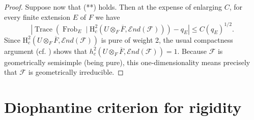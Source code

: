 \begin{proof}
Suppose now that (**) holds. Then at the expense of enlarging \(C\), for every finite extension \(E\) of \(F\) we have
\[
\left|\operatorname{Trace}(\operatorname{Frob}_E\mid\mathrm{H}^2_c(U\otimes_F\overline{F},\mathcal{E}nd(\mathcal{F})))-q_E\right|\leq C(q_E)^{1/2}.
\]
Since \(\mathrm{H}^2_c(U\otimes_F\overline{F},\mathcal{E}nd(\mathcal{F}))\) is pure of weight 2, the usual compactness argument (cf. \cite[2.2.2.1]{Ka-SE}) shows that \(h^2_c(U\otimes_F\overline{F},\mathcal{E}nd(\mathcal{F}))=1\). Because \(\mathcal{F}\) is geometrically semisimple (being pure), this one-dimensionality means precisely that \(\mathcal{F}\) is geometrically irreducible.
\end{proof}

\section{Diophantine criterion for rigidity}
\label{sec:7.1}


